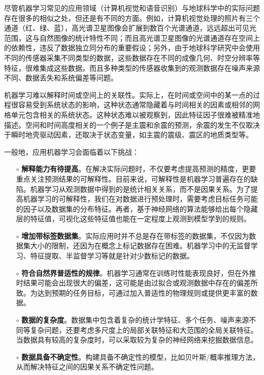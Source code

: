 尽管机器学习常见的应用领域（计算机视觉和语音识别）与地球科学中的实际问题存在很多的相似之处，但还是有不同的方面。例如，计算机视觉处理的照片有三个通道（红、绿、蓝），高光谱卫星图像会扩展到数百个光谱通道，远远超出可见光范围，这与自然图像的统计特性不同；而且高光谱卫星图像的光谱通道存在空间上的依赖性，违反了数据独立同分布的重要假设；另外，由于地球科学研究中会使用不同的传感器采集不同类型的数据，这些数据存在不同的成像几何、时空分辨率等特征，很难集成这些数据。而且多种类型的传感器收集到的观测数据存在噪声来源不同、数据丢失和系统偏差等问题。

机器学习难以解释时间或空间上的关联性。实际上，在时间或空间中的某一点的过程很容易受到系统状态的影响，这种状态通常隐藏着与时间相关的因素或相邻的网格单元包含相关的系统状态。这种状态难以被观察到，因此特征因子很难被精准地描述。空间和时间高度相关的一个例子是主震和余震的预测，余震的发生不仅取决于瞬时地壳驱动因素，还取决于状态变量，如主震的震级、震区的地质类型等。

一般地，应用机器学习会面临着以下挑战：
\begin{enumerate}
  \item[$\circ$] \textbf{解释能力有待提高}。在解决实际问题时，不仅要考虑提高预测的精度，更要重点关注预测结果的可解释性。目前来说，可解释性是机器学习普遍存在的缺陷\citep{montavon2018methods}。机器学习从观测数据中得到的是统计相关关系，而不是因果关系\citep{runge2015identifying,reichstein2019deep}。为了提高机器学习的可解释性，我们在对数据进行预处理时，需要考虑目标任务可能的因子以及数据集的分布特征。再者，基于神经网络的算法能够给出每个隐藏层的特征值，可视化这些特征值也能在一定程度上观测到模型学到的规则。
  \item[$\circ$] \textbf{增加带标签数据集}。实际应用时并不总是存在带标签的数据集，不仅因为数据集大小的限制，还因为在概念上标记数据存在困难。机器学习中的无监督学习、特征提取、半监督学习等就是针对少数标记的数据\citep{goodfellow2014generative}。
  \item[$\circ$] \textbf{符合自然界普适性的规律}。机器学习通常在训练时性能表现良好，但在外推时结果可能会出现很大的偏差，这可能是由过拟合或观测数据中存在的偏差所致\citep{friedlingstein2014uncertainties}。为达到预期的任务目标，可通过加入普适性的物理规则或提供更丰富的数据。
  \item[$\circ$] \textbf{数据的复杂度}。数据集中包含着复杂的统计学特征、多个任务、噪声来源不同等复杂问题，还要考虑多尺度上的局部关联特征和大范围的全局关联特征。当数据具有较高的复杂度时，可以采取较为复杂的神经网络来挖掘数据信息。
  \item[$\circ$] \textbf{数据具备不确定性}。构建具备不确定性的模型，比如贝叶斯/概率推理方法，从而解决特征之间的因果关系不确定性问题\citep{ghahramani2015probabilistic}。
\end{enumerate}

